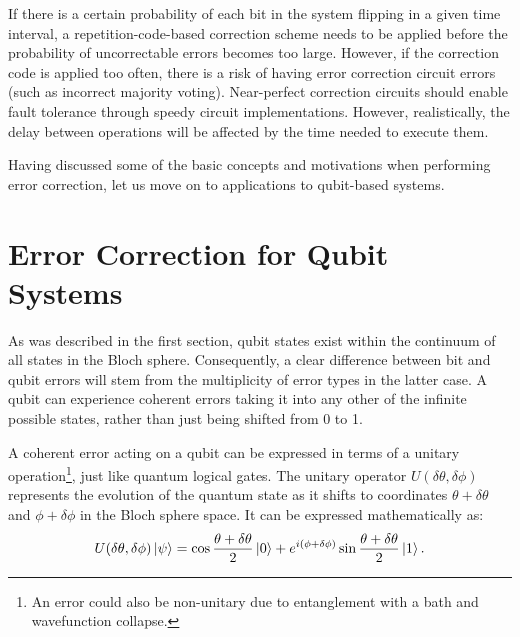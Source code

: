If there is a certain probability of each bit in the system flipping in a given time interval, a repetition-code-based correction scheme needs to be applied before the probability of uncorrectable errors becomes too large. However, if the correction code is applied too often, there is a risk of having error correction circuit errors (such as incorrect majority voting). Near-perfect correction circuits should enable fault tolerance through speedy circuit implementations. However, realistically, the delay between operations will be affected by the time needed to execute them.

Having discussed some of the basic concepts and motivations when performing error correction, let us move on to applications to qubit-based systems.


\section{Error Correction for Qubit Systems}

As was described in the first section, qubit states exist within the continuum of all states in the Bloch sphere. Consequently, a clear difference between bit and qubit errors will stem from the multiplicity of error types in the latter case. A qubit can experience coherent errors taking it into any other of the infinite possible states, rather than just being shifted from 0 to 1.

A coherent error acting on a qubit can be expressed in terms of a unitary operation\footnote{An error could also be non-unitary due to entanglement with a bath and wavefunction collapse.}, just like quantum logical gates. The unitary operator $U(\delta\theta,\delta\phi)$ represents the evolution of the quantum state as it shifts to coordinates $\theta+\delta\theta$ and $\phi+\delta\phi$ in the Bloch sphere space. It can be expressed mathematically as:
\begin{equation}
    U(\delta\theta,\delta\phi)\ket{\psi} = \cos\frac{\theta+\delta\theta}{2}\ket{0}+e^{i(\phi+\delta\phi)}\sin\frac{\theta+\delta\theta}{2}\ket{1}.
\end{equation}

